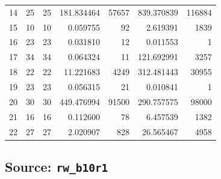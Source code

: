 \documentclass{article}
\begin{document}
\begin{landscape}
\begin{longtable}{rrrrrrr}
14 & 25 & 25 & 181.834464 & 57657 & 839.370839 & 116884 \\
15 & 10 & 10 & 0.059755 & 92 & 2.619391 & 1839 \\
16 & 23 & 23 & 0.031810 & 12 & 0.011553 & 1 \\
17 & 34 & 34 & 0.064324 & 11 & 121.692991 & 3257 \\
18 & 22 & 22 & 11.221683 & 4249 & 312.481443 & 30955 \\
19 & 23 & 23 & 0.056315 & 21 & 0.010841 & 1 \\
20 & 30 & 30 & 449.476994 & 91500 & 290.757575 & 98000 \\
21 & 16 & 16 & 0.112600 & 78 & 6.457539 & 1382 \\
22 & 27 & 27 & 2.020907 & 828 & 26.565467 & 4958 \\
\end{longtable}

\subsection*{Source: \texttt{rw\_b10r1}}


\end{landscape}
\end{document}
